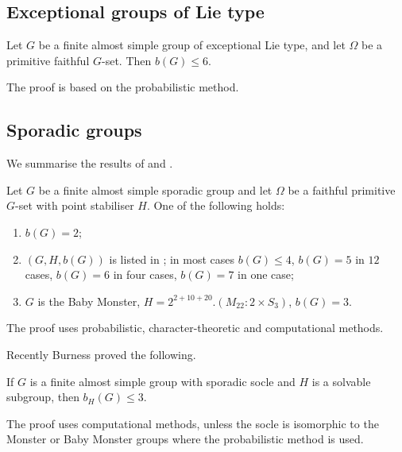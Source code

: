 \medskip

\subsection*{Exceptional groups of Lie type}

\begin{Th}
\label{intexc}
Let $G$ be a finite almost simple group of exceptional Lie type, and let $\Omega$ be
a primitive faithful $G$-set. Then $b(G) \le 6$.
\end{Th}

 The proof is based on the probabilistic method.

\medskip



\subsection*{Sporadic groups}


We summarise the results of \cite{spor} and \cite{mon}.

\begin{Th}
\label{intspor}
 Let $G$ be a finite almost simple sporadic group and let $\Omega$ be a
faithful primitive $G$-set with  point stabiliser $H$. One of the following
holds:
\begin{enumerate}[font=\normalfont]
\item $b(G)=2$;
\item $(G, H, b(G))$ is listed in  {\rm \cite[Table 1 and 2]{spor}}; in most cases $b(G)\le 4$, $b(G)=5$ in $12$ cases, $b(G)=6$ in four cases, $b(G)=7$ in one case;
\item $G$ is the Baby Monster, $H = 2^{2+10+20}.(M_{22} : 2 \times S_3)$, $b(G)=3$. 
\end{enumerate}
\end{Th} 

 The proof uses  probabilistic, character-theoretic and computational methods. 
 
 Recently Burness \cite{burspor} proved the following.

\begin{Th}
 If $G$ is a finite almost simple group with sporadic socle and $H$ is a solvable subgroup, then $b_H(G) \le 3.$ 
\end{Th} 

The proof uses computational methods, unless the socle is isomorphic to the Monster or Baby Monster groups where the probabilistic method is used. %

